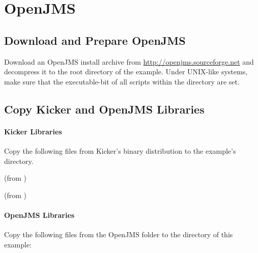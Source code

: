 \section{OpenJMS}\label{example:jms:openjms}

\subsection{Download and Prepare OpenJMS}

Download an OpenJMS install archive from \url{http://openjms.sourceforge.net} %
and decompress it to the root directory of the example. Under UNIX-like systems, make sure that the executable-bit of all scripts within the  directory are set.

\subsection{Copy Kicker and OpenJMS Libraries}

\paragraph*{Kicker Libraries}

Copy the following files from Kicker's binary distribution to %
the example's  directory.

\medskip

\begin{compactenum}
 \item \file{\mainJarEMF} (from )
 \item \file{\commonsLoggingJar} (from )
\end{compactenum}

\paragraph*{OpenJMS Libraries}

Copy the following files from the OpenJMS  folder to the %
 directory of this example:

\medskip

\begin{compactenum}
\item {}
\item {}
\item {}
\item {}
\item {}
\item {}
\end{compactenum}

